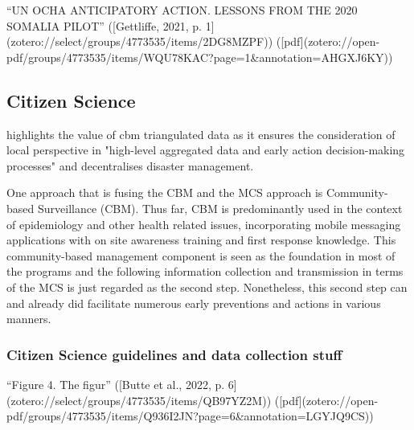 “UN OCHA ANTICIPATORY ACTION. LESSONS FROM THE 2020 SOMALIA PILOT” ([Gettliffe, 2021, p. 1](zotero://select/groups/4773535/items/2DG8MZPF)) ([pdf](zotero://open-pdf/groups/4773535/items/WQU78KAC?page=1&annotation=AHGXJ6KY))



\subsection{Citizen Science}

\autocite[20]{gualazziniEWEAEarlyWarning2021} highlights the value of \acrshort{cbm} triangulated data as it ensures the consideration of local perspective in "high-level aggregated data and early action decision-making processes" and decentralises disaster management. 

One approach that is fusing the CBM and the MCS approach is Community-based Surveillance (CBM). Thus far, CBM is predominantly used in the context of epidemiology and other health related issues, incorporating mobile messaging applications with on site awareness training and first response knowledge. This community-based management component is seen as the foundation in most of the programs and the following information collection and transmission in terms of the MCS is just regarded as the second step. Nonetheless, this second step can and already did facilitate numerous early preventions and actions in various manners.

\subsubsection{Citizen Science guidelines and data collection stuff} %
“Figure 4. The figur” ([Butte et al., 2022, p. 6](zotero://select/groups/4773535/items/QB97YZ2M)) ([pdf](zotero://open-pdf/groups/4773535/items/Q936I2JN?page=6&annotation=LGYJQ9CS))


